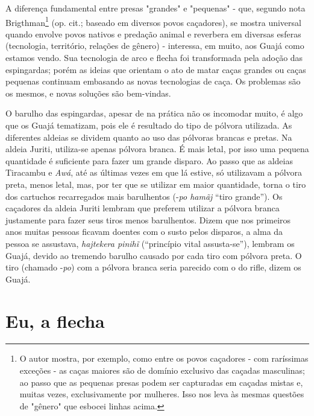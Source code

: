 A diferença fundamental entre presas "grandes" e "pequenas" - que,
segundo nota Brigthman\footnote{O autor mostra, por exemplo, como entre
  os povos caçadores - com raríssimas exceções - as caças maiores são de
  domínio exclusivo das caçadas masculinas; ao passo que as pequenas
  presas podem ser capturadas em caçadas mistas e, muitas vezes,
  exclusivamente por mulheres. Isso nos leva às mesmas questões de
  "gênero" que esbocei linhas acima.} (op. cit.; baseado em diversos
povos caçadores), se mostra universal quando envolve povos nativos e
predação animal e reverbera em diversas esferas (tecnologia, território,
relações de gênero) - interessa, em muito, aos Guajá como estamos vendo.
Sua tecnologia de arco e flecha foi transformada pela adoção das
espingardas; porém as ideias que orientam o ato de matar caças grandes
ou caças pequenas continuam embasando as novas tecnologias de caça. Os
problemas são os mesmos, e novas soluções são bem-vindas.

O barulho das espingardas, apesar de na prática não os incomodar muito,
é algo que os Guajá tematizam, pois ele é resultado do tipo de pólvora
utilizada. As diferentes aldeias se dividem quanto ao uso das pólvoras
brancas e pretas. Na aldeia Juriti, utiliza-se apenas pólvora branca. É
mais letal, por isso uma pequena quantidade é suficiente para fazer um
grande disparo. Ao passo que as aldeias Tiracambu e \emph{Awá}, até as
últimas vezes em que lá estive, só utilizavam a pólvora preta, menos
letal, mas, por ter que se utilizar em maior quantidade, torna o tiro
dos cartuchos recarregados mais barulhentos (-\emph{po hamãj} ``tiro
grande''). Os caçadores da aldeia Juriti lembram que preferem utilizar a
pólvora branca justamente para fazer seus tiros menos barulhentos. Dizem
que nos primeiros anos muitas pessoas ficavam doentes com o susto pelos
disparos, a alma da pessoa se assustava, \emph{hajtekera pinihĩ}
(``princípio vital assusta-se''), lembram os Guajá, devido ao tremendo
barulho causado por cada tiro com pólvora preta. O tiro (chamado
-\emph{po}) com a pólvora branca seria parecido com o do rifle, dizem os
Guajá.

\section{Eu, a flecha}\label{eu-a-flecha}

